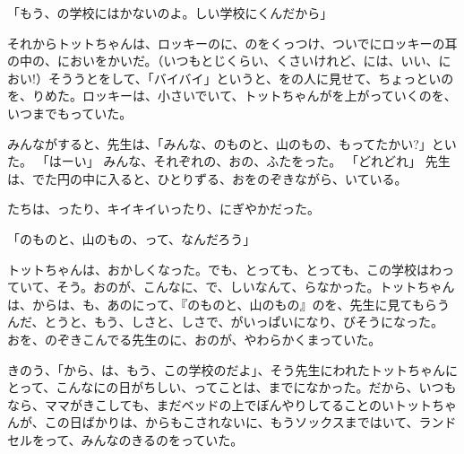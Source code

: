 「もう、の学校にはかないのよ。しい学校にくんだから」

それからトットちゃんは、ロッキーのに、のをくっつけ、ついでにロッキーの耳の中の、においをかいだ。（いつもとじくらい、くさいけれど、には、いい、におい!）そううとをして、「バイバイ」というと、をの人に見せて、ちょっといのを、りめた。ロッキーは、小さいでいて、トットちゃんがを上がっていくのを、いつまでもっていた。

みんながすると、先生は、「みんな、のものと、山のもの、もってたかい?」といた。 「はーい」 みんな、それぞれの、おの、ふたをった。 「どれどれ」 先生は、でた円の中に入ると、ひとりずる、おをのぞきながら、いている。

たちは、ったり、キイキイいったり、にぎやかだった。

「のものと、山のもの、って、なんだろう」

トットちゃんは、おかしくなった。でも、とっても、とっても、この学校はわっていて、そう。おのが、こんなに、で、しいなんて、らなかった。トットちゃんは、からは、も、あのにって、『のものと、山のもの』のを、先生に見てもらうんだ、とうと、もう、しさと、しさで、がいっぱいになり、びそうになった。 おを、のぞきこんでる先生のに、おのが、やわらかくまっていた。

きのう、「から、は、もう、この学校のだよ」、そう先生にわれたトットちゃんにとって、こんなにの日がちしい、ってことは、までになかった。だから、いつもなら、ママがきこしても、まだベッドの上でぼんやりしてることのいトットちゃんが、この日ばかりは、からもこされないに、もうソックスまではいて、ランドセルをって、みんなのきるのをっていた。

